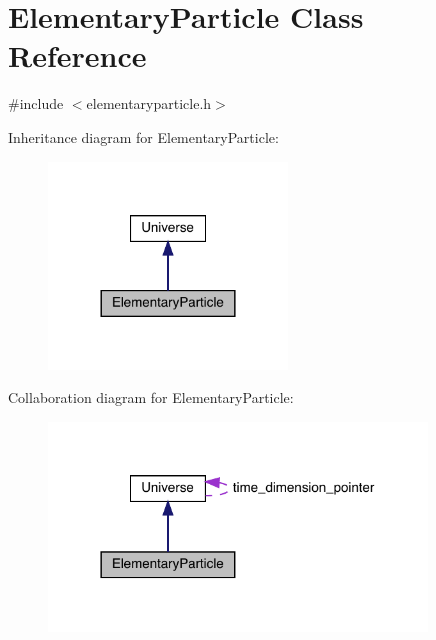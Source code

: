 \hypertarget{class_elementary_particle}{}\section{Elementary\+Particle Class Reference}
\label{class_elementary_particle}


{\ttfamily \#include $<$elementaryparticle.\+h$>$}



Inheritance diagram for Elementary\+Particle\+:\nopagebreak
\begin{figure}[H]
\begin{center}
\leavevmode
\includegraphics[width=180pt]{class_elementary_particle__inherit__graph}
\end{center}
\end{figure}


Collaboration diagram for Elementary\+Particle\+:\nopagebreak
\begin{figure}[H]
\begin{center}
\leavevmode
\includegraphics[width=285pt]{class_elementary_particle__coll__graph}
\end{center}
\end{figure}
